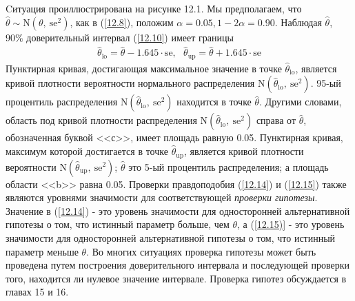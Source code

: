 \begin{figure}[H]
\end{figure}
Cитуация проиллюстрирована на рисунке 12.1. Мы предполагаем, что $\widehat{\theta} \sim \mathrm{N}(\theta, \ \text{se}^{2})$, как в (\ref{12.8}), положим 
$ \alpha = 0.05, 1-2\alpha = 0.90.$ Наблюдая $\widehat{\theta}$, $90\%$ доверительный интервал (\ref{12.10}) имеет границы
\begin{gather}\label{12.16}
\widehat{\theta}_{\text{lo}} = \widehat{\theta} - 1.645 \cdot\text{se}, \ \ \ \widehat{\theta}_{\text{up}} = \widehat{\theta} + 1.645 \cdot \text{se}
\end{gather}
Пунктирная кривая, достигающая максимальное значение в точке $\widehat{\theta}_{\text{lo}}$, является кривой плотности вероятности нормального распределения $ \mathrm{N}(\widehat{\theta}_{\text{lo}}, \  \text{se}^{2})$. 95-ый процентиль распределения $ \mathrm{N}(\widehat{\theta}_{\text{lo}}, \ \text{se}^{2})$ находится в точке $\widehat{\theta}$. Другими словами, область под кривой плотности распределения $ \mathrm{N}(\widehat{\theta}_{\text{lo}}, \ \text{se}^{2})$  справа от $\widehat{\theta}$, обозначенная буквой <<с>>, имеет площадь равную 0.05. Пунктирная кривая, максимум которой достигается в точке $\widehat{\theta}_{\text{up}}$, является кривой плотности вероятности $\mathrm{N}(\widehat{\theta}_{\text{up}}, \ \text{se}^{2})$;  $\widehat{\theta}$ это 5-ый процентиль распределения; а площадь области <<b>> равна 0.05. Проверки правдоподобия (\ref{12.14}) и (\ref{12.15}) также являются уровнями значимости для соответствующей \textit{проверки гипотезы}. Значение в (\ref{12.14}) - это уровень значимости для односторонней альтернативной гипотезы о том, что истинный параметр больше, чем  $\theta$, а (\ref{12.15)} - это уровень значимости для односторонней альтернативной гипотезы о том, что истинный параметр меньше $\theta$. Во многих ситуациях проверка гипотезы может быть проведена путем построения доверительного интервала и последующей проверки того, находится ли нулевое значение интервале. Проверка гипотез обсуждается в главах 15 и 16. 